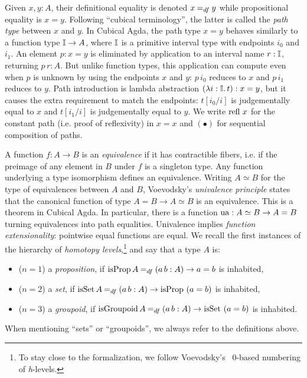 \documentclass[final,a4paper,USenglish,cleveref]{lipics-v2021}
\begin{document}
Given $x, y : A$, their definitional equality is denoted $x \DefEq y$ while propositional equality is $x = y$.
Following ``cubical terminology'', the latter is called the \emph{path type} between $x$ and $y$.
In Cubical Agda, the path type $x = y$ behaves similarly to a function type $\mathbb{I} \to A$, where $\mathbb{I}$ is a primitive interval type with endpoints $i_0$ and $i_1$.
An element $p : x = y$ is eliminated by application to an interval name $r : \mathbb{I}$, returning $p \, r : A$.
But unlike function types, this application can compute even when $p$ is unknown by using the endpoints $x$ and $y$: $p \,i_0$ reduces to $x$ and $p \,i_1$ reduces to $y$.
Path introduction is lambda abstraction $(\lambda i : \mathbb{I}.\,t) : x = y$, but it causes the extra requirement to match the endpoints: $t[i_0 / i]$ is judgementally equal to $x$ and $t[i_1 / i]$ is judgementally equal to  $y$. We write $\Refl\,x$ for the constant path (i.e. proof of reflexivity) in $x = x$ and $(\bullet)$ for sequential composition of paths.

A function $f : A \to B$ is an \emph{equivalence} if it has contractible fibers, i.e. if the preimage of any element in $B$ under $f$ is a singleton type. Any function underlying a type isomorphism defines an equivalence. Writing $A \simeq B$ for the type of equivalences between $A$ and $B$, Voevodsky's \emph{univalence principle} states that the canonical function of type $A = B \to A \simeq B$ is an equivalence. This is a theorem in Cubical Agda. In particular, there is a function $\Op{ua} : A \simeq B \to A = B$ turning equivalences into path equalities. Univalence implies \emph{function extensionality}: pointwise equal functions are equal.
We recall the first instances of the hierarchy of \emph{homotopy levels},\footnote{%
  To stay close to the formalization,
  we follow Voevodsky's~\cite{Voevodsky2015} $0$-based numbering of \emph{h}-levels.
}
and say that a type $A$ is:
\begin{itemize}
  \item[] ($n = 1$) a \emph{proposition}, if
    $\IsProp A \DefEq (a\, b : A) \to a = b$ is inhabited,
  \item[] ($n = 2$) a \emph{set}, if
    $\IsSet A \DefEq (a\, b : A) \to \IsProp \ (a = b)$ is inhabited,
  \item[] ($n = 3$) a \emph{groupoid}, if
    $\IsGpd A \DefEq (a\, b : A) \to \IsSet \ (a = b)$ is inhabited.
\end{itemize}
When mentioning \enquote{sets} or \enquote{groupoids}, we always refer to the definitions above.
\end{document}
